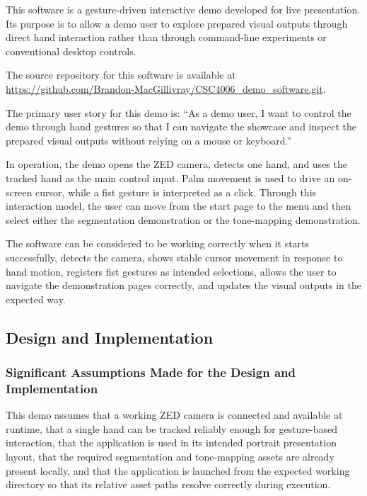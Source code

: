 ﻿\documentclass[11pt,a4paper]{article}
\begin{document}
\noindent This software is a gesture-driven interactive demo developed for
live presentation. Its purpose is to allow a demo user to explore prepared
visual outputs through direct hand interaction rather than through
command-line experiments or conventional desktop controls.

\medskip

\noindent The source repository for this software is available at
\url{https://github.com/Brandon-MacGillivray/CSC4006_demo_software.git}.

\medskip

\noindent The primary user story for this demo is: ``As a demo user, I want
to control the demo through hand gestures so that I can navigate the showcase
and inspect the prepared visual outputs without relying on a mouse or
keyboard.''

\medskip

\noindent In operation, the demo opens the ZED camera, detects one hand, and
uses the tracked hand as the main control input. Palm movement is used to
drive an on-screen cursor, while a fist gesture is interpreted as a click.
Through this interaction model, the user can move from the start page to the
menu and then select either the segmentation demonstration or the tone-mapping
demonstration.

\medskip

\noindent The software can be considered to be working correctly when it
starts successfully, detects the camera, shows stable cursor movement in
response to hand motion, registers fist gestures as intended selections,
allows the user to navigate the demonstration pages correctly, and updates the
visual outputs in the expected way.

\subsection{Design and Implementation}

\subsubsection{Significant Assumptions Made for the Design and Implementation}

This demo assumes that a working ZED camera is connected and available at
runtime, that a single hand can be tracked reliably enough for
gesture-based interaction, that the application is used in its intended
portrait presentation layout, that the required segmentation and tone-mapping
assets are already present locally, and that the application is launched from
the expected working directory so that its relative asset paths resolve
correctly during execution.
\end{document}
